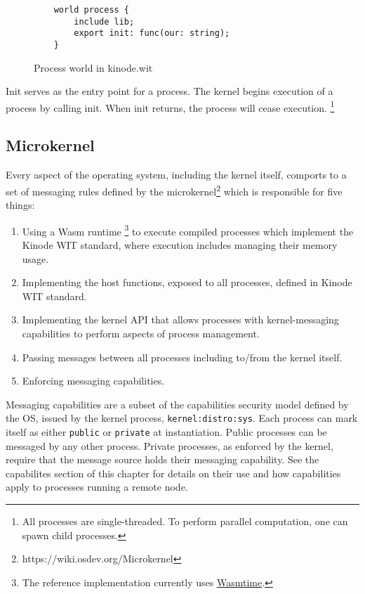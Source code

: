 \documentclass[runningheads]{llncs}
\begin{document}
\begin{figure}
    \centering
    \begin{lstlisting}
    world process {
        include lib;
        export init: func(our: string);
    }
    \end{lstlisting}
    \caption{Process world in kinode.wit}
    \label{fig:Process world}
\end{figure}

Init serves as the entry point for a process.
The kernel begins execution of a process by calling init.
When init returns, the process will cease execution.
\footnote{All processes are single-threaded. To perform parallel computation, one can spawn child processes.}

\subsection{Microkernel}

Every aspect of the operating system, including the kernel itself, comports to a set of messaging rules defined by the microkernel\footnote{https://wiki.osdev.org/Microkernel} which is responsible for five things:
\begin{enumerate}
    \item Using a Wasm runtime
    \footnote{The reference implementation currently uses \href{https://wasmtime.dev}{Wasmtime}.}
    to execute compiled processes which implement the Kinode WIT standard, where execution includes managing their memory usage.
    \item Implementing the host functions, exposed to all processes, defined in Kinode WIT standard.
    \item Implementing the kernel API that allows processes with kernel-messaging capabilities to perform aspects of process management.
    \item Passing messages between all processes including to/from the kernel itself.
    \item Enforcing messaging capabilities.
\end{enumerate}

Messaging capabilities are a subset of the capabilities security model defined by the OS, issued by the kernel process, \verb|kernel:distro:sys|.
Each process can mark itself as either \verb|public| or \verb|private| at instantiation.
Public processes can be messaged by any other process.
Private processes, as enforced by the kernel, require that the message source holds their messaging capability.
See the capabilites section of this chapter for details on their use and how capabilities apply to processes running a remote node.
\end{document}
